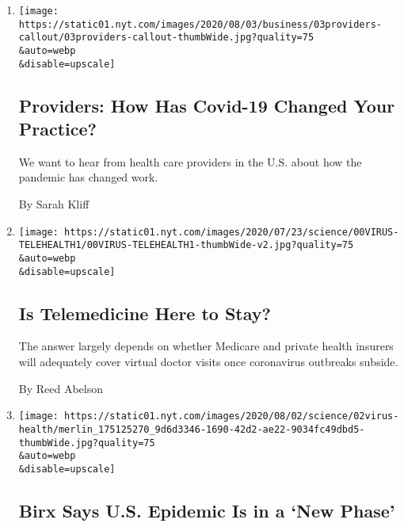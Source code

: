 \begin{enumerate}
\def\labelenumi{\arabic{enumi}.}
\item
  \href{/2020/08/03/reader-center/healthcare-workers-coronavirus-care.html}{}

  \texttt{[image: https://static01.nyt.com/images/2020/08/03/business/03providers-callout/03providers-callout-thumbWide.jpg?quality=75\\\&auto=webp\\\&disable=upscale]}

  \hypertarget{providers-how-has-covid-19-changed-your-practice}{%
  \subsection{Providers: How Has Covid-19 Changed Your
  Practice?}\label{providers-how-has-covid-19-changed-your-practice}}

  We want to hear from health care providers in the U.S. about how the
  pandemic has changed work.

  By Sarah Kliff
\item
  \href{/2020/08/03/health/covid-telemedicine-congress.html}{}

  \texttt{[image: https://static01.nyt.com/images/2020/07/23/science/00VIRUS-TELEHEALTH1/00VIRUS-TELEHEALTH1-thumbWide-v2.jpg?quality=75\\\&auto=webp\\\&disable=upscale]}

  \hypertarget{is-telemedicine-here-to-stay}{%
  \subsection{Is Telemedicine Here to
  Stay?}\label{is-telemedicine-here-to-stay}}

  The answer largely depends on whether Medicare and private health
  insurers will adequately cover virtual doctor visits once coronavirus
  outbreaks subside.

  By Reed Abelson
\item
  \href{/2020/08/02/health/dr-birx-coronavirus-phase.html}{}

  \texttt{[image: https://static01.nyt.com/images/2020/08/02/science/02virus-health/merlin\_175125270\_9d6d3346-1690-42d2-ae22-9034fc49dbd5-thumbWide.jpg?quality=75\\\&auto=webp\\\&disable=upscale]}

  \hypertarget{birx-says-us-epidemic-is-in-a-new-phase}{%
  \subsection{Birx Says U.S. Epidemic Is in a `New
  Phase'}\label{birx-says-us-epidemic-is-in-a-new-phase}}


\end{enumerate}
